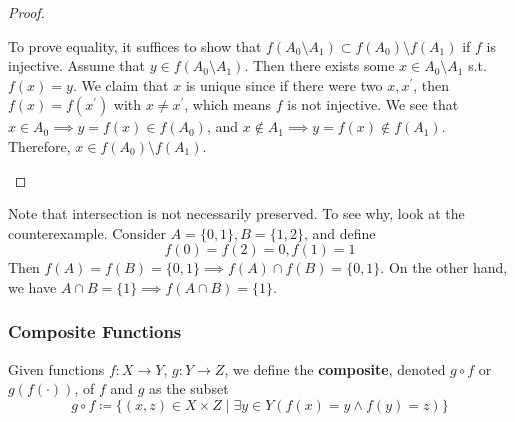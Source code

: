 \begin{proof}
\begin{enumerate}
      To prove equality, it suffices to show that $f(A_0 \setminus A_1) \subset f(A_0) \setminus f(A_1)$ if $f$ is injective. Assume that $y \in f(A_0 \setminus A_1)$. Then there exists some $x \in A_0 \setminus A_1$ s.t. $f(x) = y$. We claim that $x$ is unique since if there were two $x, x^\prime$, then $f(x) = f(x^\prime)$ with $x \neq x^\prime$, which means $f$ is not injective. We see that $x \in A_0 \implies y = f(x) \in f(A_0)$, and $x \not\in A_1 \implies y = f(x) \not\in f(A_1)$. Therefore, $x \in f(A_0) \setminus f(A_1)$. 
    \end{enumerate}
  \end{proof} 

  \begin{example}
    \label{ex:intersection-not-necessarily-preserved}
    Note that intersection is not necessarily preserved. To see why, look at the counterexample. Consider $A = \{0, 1\}, B = \{1, 2\}$, and define 
    \begin{equation}
      f(0) = f(2) = 0, f(1) = 1
    \end{equation} 
    Then $f(A) = f(B) = \{0, 1\} \implies f(A) \cap f(B) = \{0, 1\}$. On the other hand, we have $A \cap B = \{1\} \implies f(A \cap B) = \{1\}$. 
  \end{example}

\subsubsection{Composite Functions}

  \begin{definition}[Composition]
    \label{def:composition}
    Given functions $f: X \rightarrow Y$, $g: Y \rightarrow Z$, we define the \textbf{composite}, denoted $g \circ f$ or $g(f(\cdot))$, of $f$ and $g$ as the subset
    \begin{equation}
      g \circ f \coloneqq \{ (x, z) \in X \times Z \mid \exists y \in Y (f(x) = y \land f(y) = z) \}
    \end{equation} 
  \end{definition}

